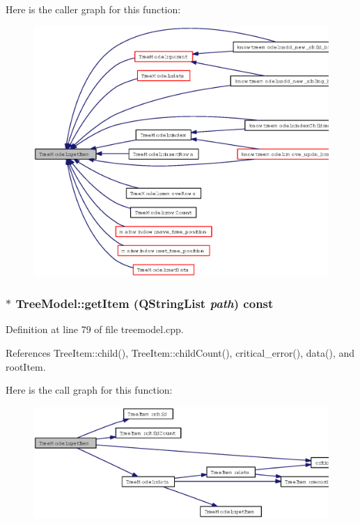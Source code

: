 Here is the caller graph for this function:\begin{figure}[H]
\begin{center}
\leavevmode
\includegraphics[width=320pt]{classTreeModel_4944fbea068c3d4bc7b25f4a7087b5f0_icgraph}
\end{center}
\end{figure}
\subsubsection{ $\ast$ Tree\-Model::get\-Item (QString\-List {\em path}) const}\label{classTreeModel_eebd988f3ffa0c5b90364be1f9c30eff}




Definition at line 79 of file treemodel.cpp.

References Tree\-Item::child(), Tree\-Item::child\-Count(), critical\_\-error(), data(), and root\-Item.

Here is the call graph for this function:\begin{figure}[H]
\begin{center}
\leavevmode
\includegraphics[width=352pt]{classTreeModel_eebd988f3ffa0c5b90364be1f9c30eff_cgraph}
\end{center}
\end{figure}


